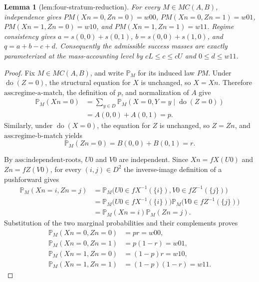 \documentclass{article}
\newtheorem{lemma}{Lemma}
\begin{document}
\begin{lemma}[lem:four-stratum-reduction]\label{lem:four-stratum-reduction}
For every \(M\in MC(A,B)\), independence gives \(PM(Xn=0,Zn=0)=w00\), \(PM(Xn=0,Zn=1)=w01\), \(PM(Xn=1,Zn=0)=w10\), and \(PM(Xn=1,Zn=1)=w11\). Regime consistency gives \(a=s(0,0)+s(0,1)\), \(b=s(0,0)+s(1,0)\), and \(q=a+b-c+d\). Consequently the admissible success masses are exactly parameterized at the mass-accounting level by \(cL\le c\le cU\) and \(0\le d\le w11\).
\end{lemma}
\begin{proof}
Fix \(M\in MC(A,B)\), and write \(\mathbb P_M\) for its induced law \(PM\).  Under \(\operatorname{do}(Z=0)\), the structural equation for \(X\) is unchanged, so \(X=Xn\).  Therefore \(\text{ass:regime-a-match}\), the definition of \(p\), and normalization of \(A\) give
\[
\begin{aligned}
\mathbb P_M(Xn=0)
&=\sum_{y\in D}\mathbb P_M(X=0,Y=y\mid\operatorname{do}(Z=0))\\
&=A(0,0)+A(0,1)=p.
\end{aligned}
\]
Similarly, under \(\operatorname{do}(X=0)\), the equation for \(Z\) is unchanged, so \(Z=Zn\), and \(\text{ass:regime-b-match}\) yields
\[
\mathbb P_M(Zn=0)=B(0,0)+B(0,1)=r.
\]

By \(\text{ass:independent-roots}\), \(U0\) and \(V0\) are independent.  Since \(Xn=fX(U0)\) and \(Zn=fZ(V0)\), for every \((i,j)\in D^2\) the inverse-image definition of a pushforward gives
\[
\begin{aligned}
\mathbb P_M(Xn=i,Zn=j)
&=\mathbb P_M\bigl(U0\in fX^{-1}(\{i\}),V0\in fZ^{-1}(\{j\})\bigr)\\
&=\mathbb P_M\bigl(U0\in fX^{-1}(\{i\})\bigr)
  \mathbb P_M\bigl(V0\in fZ^{-1}(\{j\})\bigr)\\
&=\mathbb P_M(Xn=i)\mathbb P_M(Zn=j).
\end{aligned}
\]
Substitution of the two marginal probabilities and their complements proves
\[
\begin{aligned}
\mathbb P_M(Xn=0,Zn=0)&=pr=w00,\\
\mathbb P_M(Xn=0,Zn=1)&=p(1-r)=w01,\\
\mathbb P_M(Xn=1,Zn=0)&=(1-p)r=w10,\\
\mathbb P_M(Xn=1,Zn=1)&=(1-p)(1-r)=w11.
\end{aligned}
\]


\end{proof}
\end{document}
